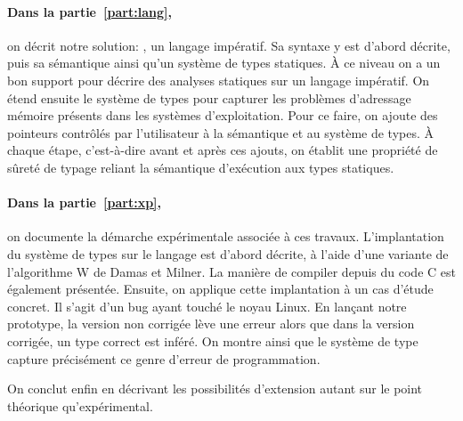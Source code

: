 \paragraph{Dans la partie~\ref{part:lang},} on décrit notre solution:
\langname{}, un langage impératif. Sa syntaxe y est d'abord décrite, puis sa
sémantique ainsi qu'un système de types statiques. À ce niveau on a un bon
support pour décrire des analyses statiques sur un langage impératif. On étend
ensuite le système de types pour capturer les problèmes d'adressage mémoire
présents dans les systèmes d'exploitation. Pour ce faire, on ajoute des
pointeurs contrôlés par l'utilisateur à la sémantique et au système de types. À
chaque étape, c'est-à-dire avant et après ces ajouts, on établit une propriété
de sûreté de typage reliant la sémantique d'exécution aux types statiques.

\paragraph{Dans la partie~\ref{part:xp},} on documente la démarche expérimentale associée
à ces travaux.
L'implantation du système de types sur le langage \newspeak est d'abord décrite,
à l'aide d'une variante de l'algorithme W de Damas et Milner.
La manière de compiler depuis du code C est également présentée.
Ensuite, on applique cette implantation à un cas d'étude concret. Il s'agit d'un
bug ayant touché le noyau Linux. En lançant notre prototype, la version non
corrigée lève une erreur alors que dans la version corrigée, un type correct est
inféré. On montre ainsi que le système de type capture précisément ce genre
d'erreur de programmation.


On conclut enfin en décrivant les possibilités d'extension autant sur le point
théorique qu'expérimental.

